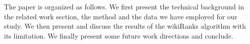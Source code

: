 The paper is organized as follows. We first present the technical background in the related work section, the method and the data we have employed for our study. We then present and discuss the results of the wikiRanks algorithm with its limitation. We finally present some future work directions and conclude.


